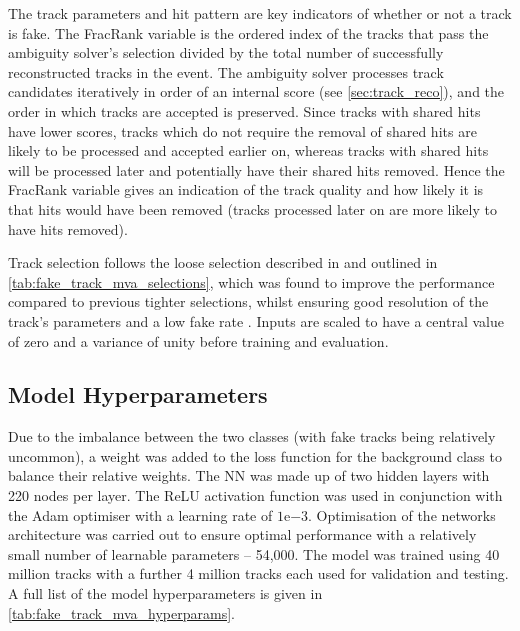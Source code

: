 The track parameters and hit pattern are key indicators of whether or not a track is fake.
The FracRank variable is the ordered index of the tracks that pass the ambiguity solver's selection divided by the total number of successfully reconstructed tracks in the event.
The ambiguity solver processes track candidates iteratively in order of an internal score (see \cref{sec:track_reco}), and the order in which tracks are accepted is preserved.
Since tracks with shared hits have lower scores, tracks which do not require the removal of shared hits are likely to be processed and accepted earlier on, whereas tracks with shared hits will be processed later and potentially have their shared hits removed.
Hence the FracRank variable gives an indication of the track quality and how likely it is that hits would have been removed (tracks processed later on are more likely to have hits removed).

Track selection follows the loose selection described in  and outlined in \cref{tab:fake_track_mva_selections}, which was found to improve the performance compared to previous tighter selections, whilst ensuring good resolution of the track's parameters and a low fake rate \cite{PERF-2015-08}.
Inputs are scaled to have a central value of zero and a variance of unity before training and evaluation.


\subsection{Model Hyperparameters}\label{sec:hyperparameters}

Due to the imbalance between the two classes (with fake tracks being relatively uncommon), a weight was added to the loss function for the background class to balance their relative weights.
The NN was made up of two hidden layers with 220 nodes per layer.
The ReLU activation function was used in conjunction with the Adam optimiser with a learning rate of $1\text{e}{-3}$.
Optimisation of the networks architecture was carried out to ensure optimal performance with a relatively small number of learnable parameters -- 54,000.
The model was trained using \num{40} million tracks with a further \num{4} million tracks each used for validation and testing.
A full list of the model hyperparameters is given in \cref{tab:fake_track_mva_hyperparams}.

